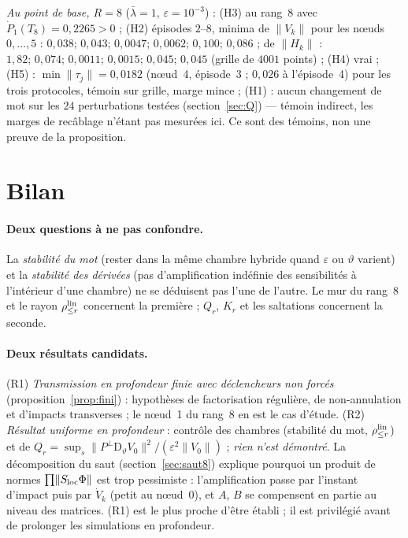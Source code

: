 \documentclass[11pt,a4paper]{article}
\theoremstyle{remark}
\newcommand{\vth}{\vartheta}
\newcommand{\D}{\mathrm D}
\begin{document}
\noindent\emph{Au point de base, $R=8$} ($\bar\lambda=1$, $\varepsilon=10^{-3}$) : (H3) au rang~8 avec $\dot P_1(T_8)=0{,}2265>0$ ; (H2) \'episodes $2$--$8$, minima de $\lVert V_k\rVert$ pour les n\oe uds $0,\dots,5$ : $0{,}038;\,0{,}043;\,0{,}0047;\,0{,}0062;\,0{,}100;\,0{,}086$ ; de $\lVert H_k\rVert$ : $1{,}82;\,0{,}074;\,0{,}0011;\,0{,}0015;\,0{,}045;\,0{,}045$ (grille de $4001$ points) ; (H4) vrai ; (H5) : $\min\lVert\tau_j\rVert=0{,}0182$ (n\oe ud~4, \'episode~3 ; $0{,}026$ \`a l'\'episode~4) pour les trois protocoles, t\'emoin sur grille, marge mince ; (H1) : aucun changement de mot sur les $24$ perturbations test\'ees (section~\ref{sec:Q}) --- t\'emoin indirect, les marges de recâblage n'\'etant pas mesur\'ees ici. Ce sont des t\'emoins, non une preuve de la proposition.

\section{Bilan}
\paragraph{Deux questions \`a ne pas confondre.} La \emph{stabilit\'e du mot} (rester dans la m\^eme chambre hybride quand $\varepsilon$ ou $\vth$ varient) et la \emph{stabilit\'e des d\'eriv\'ees} (pas d'amplification ind\'efinie des sensibilit\'es \`a l'int\'erieur d'une chambre) ne se d\'eduisent pas l'une de l'autre. Le mur du rang~8 et le rayon $\rho_{\le r}^{\rm lin}$ concernent la premi\`ere ; $Q_r$, $K_r$ et les saltations concernent la seconde.

\paragraph{Deux r\'esultats candidats.} (R1) \emph{Transmission en profondeur finie avec d\'eclencheurs non forc\'es} (proposition~\ref{prop:fini}) : hypoth\`eses de factorisation r\'eguli\`ere, de non-annulation et d'impacts transverses ; le n\oe ud~1 du rang~8 en est le cas d'\'etude. (R2) \emph{R\'esultat uniforme en profondeur} : contr\^ole des chambres (stabilit\'e du mot, $\rho^{\rm lin}_{\le r}$) et de $Q_r=\sup_s\lVert P^\perp\D_\vth V_0\rVert^2/(\varepsilon^2\lVert V_0\rVert)$ ; \emph{rien n'est d\'emontr\'e}. La d\'ecomposition du saut (section~\ref{sec:saut8}) explique pourquoi un produit de normes $\prod\lVert S_{\rm loc}\Phi\rVert$ est trop pessimiste : l'amplification passe par l'instant d'impact puis par $\dot V_k$ (petit au n\oe ud~0), et $A$, $B$ se compensent en partie au niveau des matrices. (R1) est le plus proche d'\^etre \'etabli ; il est privil\'egi\'e avant de prolonger les simulations en profondeur.
\end{document}
